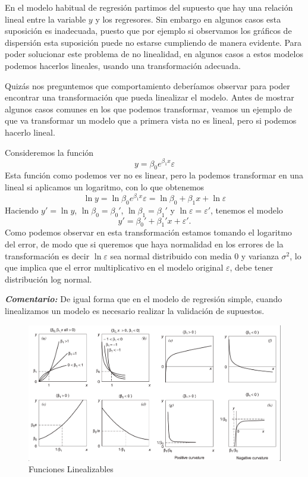 \documentclass[
]{article}
\begin{document}
En el modelo habitual de regresión partimos del supuesto que hay una
relación lineal entre la variable \(y\) y los regresores. Sin embargo en
algunos casos esta suposición es inadecuada, puesto que por ejemplo si
observamos los gráficos de dispersión esta suposición puede no estarse
cumpliendo de manera evidente. Para poder solucionar este problema de no
linealidad, en algunos casos a estos modelos podemos hacerlos lineales,
usando una transformación adecuada.

Quizás nos preguntemos que comportamiento deberíamos observar para poder
encontrar una transformación que pueda linealizar el modelo. Antes de
mostrar algunos casos comunes en los que podemos transformar, veamos un
ejemplo de que va transformar un modelo que a primera vista no es
lineal, pero si podemos hacerlo lineal.

Consideremos la función \[y=\beta_0 e^{\beta_1 x}\varepsilon\] Esta
función como podemos ver no es linear, pero la podemos transformar en
una lineal si aplicamos un logaritmo, con lo que obtenemos
\[\ln{y}=\ln{\beta_0 e^{\beta_1 x}\varepsilon}=\ln{\beta_0}+\beta_1 x+\ln{\varepsilon}\]
Haciendo \(y'=\ln{y}\), \(\ln{\beta_0}=\beta_0'\),
\(\ln{\beta_1}=\beta_1'\) y \(\ln{\varepsilon}=\varepsilon'\), tenemos
el modelo \[y'=\beta_0'+\beta_1' x+\varepsilon'.\] Como podemos observar
en esta transformación estamos tomando el logaritmo del error, de modo
que si queremos que haya normalidad en los errores de la transformación
es decir \(\ln{\varepsilon}\) sea normal distribuido con media \(0\) y
varianza \(\sigma^2\), lo que implica que el error multiplicativo en el
modelo original \(\varepsilon\), debe tener distribución log normal.

\textbf{\emph{Comentario:}} De igual forma que en el modelo de regresión
simple, cuando linealizamos un modelo es necesario realizar la
validación de supuestos.

\begin{figure}
\centering
\includegraphics{images/Linealizables-01.png}
\caption{Funciones Linealizables}
\end{figure}
\end{document}
